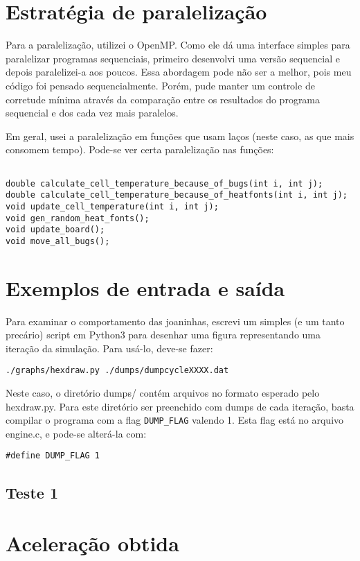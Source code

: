 \documentclass[a4paper,11pt]{article} %
\begin{document}
\pagebreak
\section{Estratégia de paralelização}

Para a paralelização, utilizei o OpenMP. Como ele dá uma interface simples para paralelizar programas sequenciais, primeiro desenvolvi uma versão sequencial e depois paralelizei-a aos poucos. Essa abordagem pode não ser a melhor, pois meu código foi pensado sequencialmente. Porém, pude manter um controle de corretude mínima através da comparação entre os resultados do programa sequencial e dos cada vez mais paralelos.

Em geral, usei a paralelização em funções que usam laços (neste caso, as que mais consomem tempo). Pode-se ver certa paralelização nas funções:
\begin{verbatim}

double calculate_cell_temperature_because_of_bugs(int i, int j);
double calculate_cell_temperature_because_of_heatfonts(int i, int j);
void update_cell_temperature(int i, int j);
void gen_random_heat_fonts();
void update_board();
void move_all_bugs();

\end{verbatim}


\section{Exemplos de entrada e saída}
\mbox{}

Para examinar o comportamento das joaninhas, escrevi um simples (e um tanto precário) script em Python3 para desenhar uma figura representando uma iteração da simulação. Para usá-lo, deve-se fazer:
\begin{verbatim}
./graphs/hexdraw.py ./dumps/dumpcycleXXXX.dat
\end{verbatim}

Neste caso, o diretório dumps/ contém arquivos no formato esperado pelo hexdraw.py. Para este diretório ser preenchido com dumps de cada iteração, basta compilar o programa com a flag {\tt DUMP\_FLAG} valendo 1. Esta flag está no arquivo engine.c, e pode-se alterá-la com:
\begin{verbatim}
#define DUMP_FLAG 1
\end{verbatim}

\subsection{Teste 1}




\section{Aceleração obtida}
\mbox{}
\end{document}
